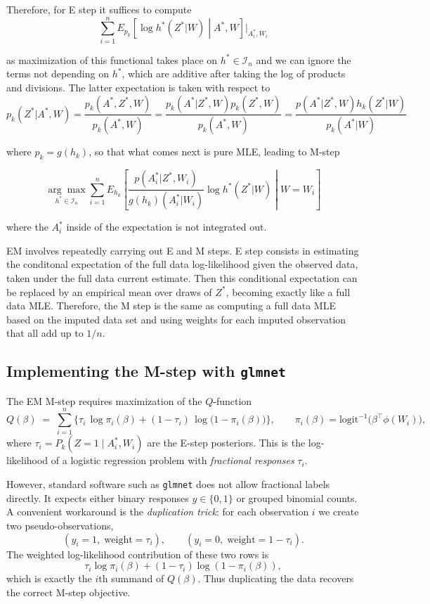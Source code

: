 \documentclass[12pt]{article}
\theoremstyle{thmstyleone}%
\theoremstyle{thmstyletwo}%
\theoremstyle{thmstylethree}%
\begin{document}
\noindent Therefore, for E step it suffices to compute 
$$ \sum_{i=1}^n  E_{p_k} \left[\log {h^*(Z^*|W)} \middle| A^*,W\right] \Big|_{A^*_i,W_i}$$

\noindent as maximization of this functional takes place on $h^* \in \mathcal{I}_n$ and we can ignore the terms not depending on $h^*$, which are additive after taking the log of products and divisions. The latter expectation is taken with respect to
$$  p_k(Z^*|A^*,W) = \frac{p_k(A^*,Z^*,W)}{p_k(A^*,W)} =  \frac{p_k(A^*|Z^*,W) p_k(Z^*,W)}{p_k(A^*,W)} =  \frac{p(A^*|Z^*,W) h_k(Z^*|W)}{p_k(A^*|W)}$$

\noindent where $p_k=  g(h_k)$, so that what comes next is pure MLE, leading to M-step 

$$ \underset{h^* \in \mathcal{I}_n}{\arg \max } \sum_{i=1}^n  E_{h_k} \left[   \frac{p(A_i^*|Z^*,W_i) }{g(h_k)(A^*_i|W_i)} \log {h^*(Z^*|W)}\middle| W=W_i\right]$$

\noindent where the $A^*_i$ inside of the expectation is not integrated out. 


EM involves repeatedly carrying out E and M steps. E step consists in estimating the conditonal expectation of the full data log-likelihood given the observed data, taken under the full data current estimate. Then this conditional expectation can be replaced by an empirical mean over draws of $Z^*$, becoming exactly like a full data MLE. Therefore, the M step is the same as computing a full data MLE based on the imputed data set and using weights for each imputed observation that all add up to $1/n$. 

\subsection{Implementing the M-step with \texttt{glmnet}}

The EM M-step requires maximization of the $Q$-function
\[
Q(\beta) \;=\; \sum_{i=1}^n \Big\{ \tau_i \,\log \pi_i(\beta) 
+ (1-\tau_i)\,\log\bigl(1-\pi_i(\beta)\bigr) \Big\}, 
\qquad
\pi_i(\beta)=\mathrm{logit}^{-1}\!\big(\beta^\top \phi(W_i)\big),
\]
where $\tau_i = P_k(Z=1\mid A_i^*,W_i)$ are the E-step posteriors.  
This is the log-likelihood of a logistic regression problem with \emph{fractional responses} $\tau_i$.  

However, standard software such as \texttt{glmnet} does not allow fractional labels directly.  
It expects either binary responses $y\in\{0,1\}$ or grouped binomial counts.  
A convenient workaround is the \emph{duplication trick}: for each observation $i$ we create two pseudo-observations,
\[
(y_i=1,\;\text{weight}=\tau_i), 
\qquad
(y_i=0,\;\text{weight}=1-\tau_i).
\]
The weighted log-likelihood contribution of these two rows is
\[
\tau_i\log \pi_i(\beta) + (1-\tau_i)\log(1-\pi_i(\beta)),
\]
which is exactly the $i$th summand of $Q(\beta)$.  
Thus duplicating the data recovers the correct M-step objective.  
\end{document}
